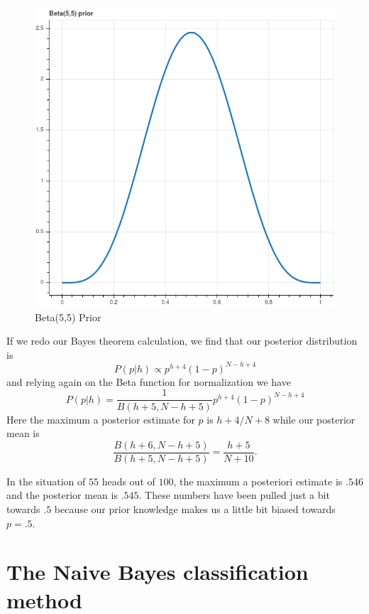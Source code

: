 \documentclass[
  oneside]{scrbook}
\begin{document}
\begin{figure}
\hypertarget{fig:betaprior}{%
\centering
\includegraphics{img/betaprior.png}
\caption{Beta(5,5) Prior}\label{fig:betaprior}
}
\end{figure}

If we redo our Bayes theorem calculation, we find that our posterior
distribution is \[
P(p|h) \propto p^{h+4}(1-p)^{N-h+4}
\] and relying again on the Beta function for normalization we have \[
P(p|h) = \frac{1}{B(h+5,N-h+5)}p^{h+4}(1-p)^{N-h+4}
\] Here the maximum a posterior estimate for \(p\) is \(h+4/N+8\) while
our posterior mean is \[
\frac{B(h+6,N-h+5)}{B(h+5,N-h+5)} = \frac{h+5}{N+10}.
\]

In the situation of \(55\) heads out of \(100\), the maximum a
posteriori estimate is \(.546\) and the posterior mean is \(.545\).
These numbers have been pulled just a bit towards \(.5\) because our
prior knowledge makes us a little bit biased towards \(p=.5\).


\hypertarget{the-naive-bayes-classification-method}{%
\chapter{The Naive Bayes classification
method}\label{the-naive-bayes-classification-method}}
\end{document}
